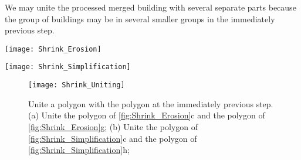We may unite the processed merged building with several separate parts 
because the group of buildings may be in several smaller groups
in the immediately previous step.

\begin{figure*}[tb]
	\centering
	\texttt{[image: Shrink\_Erosion]}
	\caption{A building shrinks during growing because of dilation and erosion, 
		where $t_1=0.6$, $t_2=0.7$, and $t_3=1$.
		The small gray polygons represent the original building.
		(a) Grow and Dilate the building with distances $\dtrm[1]{G}$ and 
		$\dtrm[1]{D}$, respectively;
		(b) Erode the polygon in (a) with distance $\dtrm[1]{D} + \dtrm[1]{E}$;
		(c) Dilate the polygon in (b) with distance $\dtrm[1]{E}$.
		(d) The large gray polygon is the target shape on goal map.
		The process for (e), (f), and (g) is the same as the process of (a), 
		(b), and (c).
		The darker gray piece in (g) shows 
		the part which is included in the grown polygon of (c), 
		but not in the grown polygon of (g).
	}
	\label{fig:Shrink_Erosion}
\end{figure*}

\begin{figure*}[tb]
	\centering
	\texttt{[image: Shrink\_Simplification]}
	\caption{A building shrinks during growing because of line simplification, 
		where $t_1=0.7$, $t_2=0.8$, and $t_3=1$.
		The small gray polygons represent the original building.
		The process for (a), (b), and (c), and 
		the process for (e), (f), and (g) are the same as 
		the processes in \fig\ref{fig:Shrink_Erosion}.
		(d) The large gray polygon is the target shape on goal map.
		(h) Simplify the polygon in (g) using the Imai--Iri algorithm.
		Note that $d_{l,t_1}<d_{l,t_2}$ see \eq\ref{eq:d_lt}),
		which is why the Imai--Iri algorithm does not 
		remove any point of the polygon in (c),
		but removes two points of the polygon in (g).
		The darker gray pieces in (h) show 
		the parts which are included in the polygon of (c), 
		but not in the polygon of (h).
	}
	\label{fig:Shrink_Simplification}
\end{figure*}

\begin{figure}[tb]
	\centering
	\texttt{[image: Shrink\_Uniting]}
	\caption{Unite a polygon with the polygon at the immediately previous step.
		(a) Unite the polygon of \fig\ref{fig:Shrink_Erosion}c and the 
		polygon of \fig\ref{fig:Shrink_Erosion}g;
		(b) Unite the polygon of \fig\ref{fig:Shrink_Simplification}c and 
		the polygon of \fig\ref{fig:Shrink_Simplification}h;
	}
	\label{fig:Shrink_Uniting}
\end{figure}




